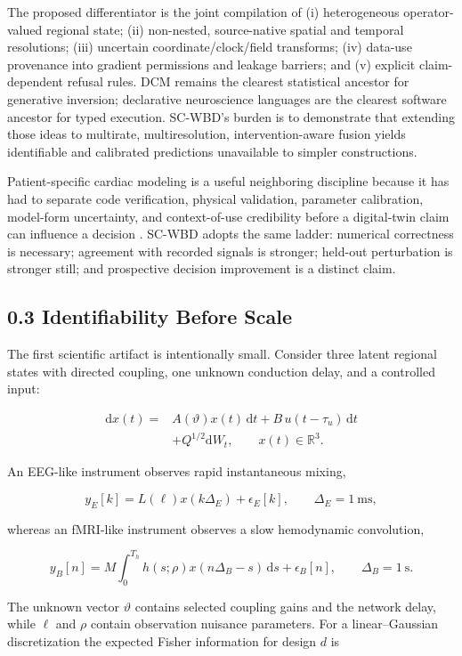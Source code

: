 The proposed differentiator is the joint compilation of (i) heterogeneous
operator-valued regional state; (ii) non-nested, source-native spatial and
temporal resolutions; (iii) uncertain coordinate/clock/field transforms;
(iv) data-use provenance into gradient permissions and leakage barriers; and
(v) explicit claim-dependent refusal rules. DCM remains the clearest
statistical ancestor for generative inversion; declarative neuroscience
languages are the clearest software ancestor for typed execution. SC-WBD's
burden is to demonstrate that extending those ideas to multirate,
multiresolution, intervention-aware fusion yields identifiable and calibrated
predictions unavailable to simpler constructions.

Patient-specific cardiac modeling is a useful neighboring discipline because
it has had to separate code verification, physical validation, parameter
calibration, model-form uncertainty, and context-of-use credibility before a
digital-twin claim can influence a decision \citep{galappaththige2022}. SC-WBD
adopts the same ladder: numerical correctness is necessary; agreement with
recorded signals is stronger; held-out perturbation is stronger still; and
prospective decision improvement is a distinct claim.

\subsection{0.3 Identifiability Before Scale}

The first scientific artifact is intentionally small. Consider three latent
regional states with directed coupling, one unknown conduction delay, and a
controlled input:

\[
\begin{aligned}
\mathrm d x(t)={}&A(\vartheta)x(t)\,\mathrm dt
+B\,u(t-\tau_u)\,\mathrm dt\\
&+Q^{1/2}\mathrm dW_t,
\qquad x(t)\in\mathbb R^3 .
\end{aligned}
\tag{T1}
\]

An EEG-like instrument observes rapid instantaneous mixing,

\[
y_E[k]=L(\ell)x(k\Delta_E)+\epsilon_E[k],
\qquad \Delta_E=1~\mathrm{ms},
\tag{T2}
\]

whereas an fMRI-like instrument observes a slow hemodynamic convolution,

\[
y_B[n]=M\!\int_0^{T_h}h(s;\rho)x(n\Delta_B-s)\,\mathrm ds
+\epsilon_B[n],
\qquad \Delta_B=1~\mathrm{s}.
\tag{T3}
\]

The unknown vector \(\vartheta\) contains selected coupling gains and the
network delay, while \(\ell\) and \(\rho\) contain observation nuisance
parameters. For a linear--Gaussian discretization the expected Fisher
information for design \(d\) is

